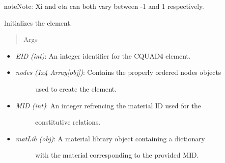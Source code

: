 \documentclass[letterpaper,10pt,english]{sphinxmanual}
\begin{document}
\begin{fulllineitems}
\begin{fulllineitems}
\begin{itemize}
\begin{description}
\end{description}

\end{itemize}

\begin{notice}{note}{Note:}
Xi and eta can both vary between -1 and 1 respectively.
\end{notice}

\end{fulllineitems}


\begin{fulllineitems}
\label{structures:AeroComBAT.Structures.CQUAD4.__init__}
Initializes the element.
\begin{quote}\begin{description}
\item[{Args}] \leavevmode
\end{description}\end{quote}
\begin{itemize}
\item {} 
\emph{EID (int)}: An integer identifier for the CQUAD4 element.

\item {} \begin{description}
\item[{\emph{nodes (1x4 Array{[}obj{]})}: Contains the properly ordered nodes objects}] \leavevmode
used to create the element.

\end{description}

\item {} \begin{description}
\item[{\emph{MID (int)}: An integer refrencing the material ID used for the}] \leavevmode
constitutive relations.

\end{description}

\item {} \begin{description}
\item[{\emph{matLib (obj)}: A material library object containing a dictionary}] \leavevmode
with the material corresponding to the provided MID.

\end{description}


\end{itemize}
\end{fulllineitems}
\end{fulllineitems}
\end{document}
